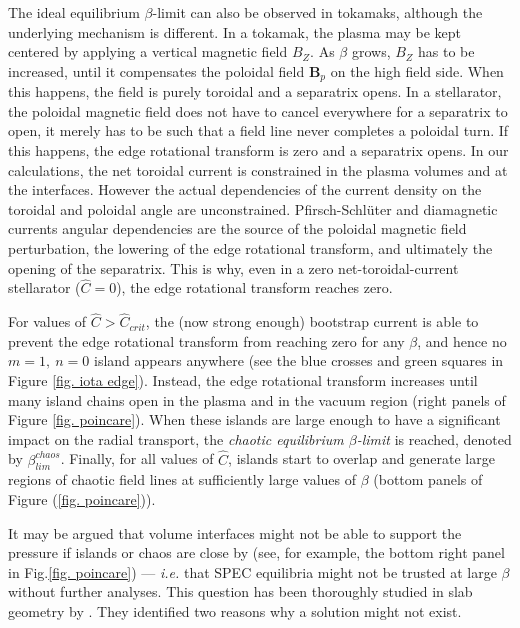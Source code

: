 \documentclass[my_thesis.tex]{subfiles}
\begin{document}
The ideal equilibrium $\beta$-limit can also be observed in tokamaks, although the underlying mechanism is different. In a tokamak, the plasma may be kept centered by applying a vertical magnetic field $B_Z$. As $\beta$ grows, $B_Z$ has to be increased, until it compensates the poloidal field $\mathbf{B}_p$ on the high field side. When this happens, the field is purely toroidal and a separatrix opens.
In a stellarator, the poloidal magnetic field does not have to cancel everywhere for a separatrix to open, it merely has to be such that a field line never completes a poloidal turn. If this happens, the edge rotational transform is zero and a separatrix opens.
In our calculations, the net toroidal current is constrained in the plasma volumes and at the interfaces. However the actual dependencies of the current density on the toroidal and poloidal angle are unconstrained. Pfirsch-Schl\"uter and diamagnetic currents angular dependencies are the source of the poloidal magnetic field perturbation, the lowering of the edge rotational transform, and ultimately the opening of the separatrix. This is why, even in a zero net-toroidal-current stellarator ($\hat{C}=0$), the edge rotational transform reaches zero.

For values of $\hat{C}>\hat{C}_{crit}$, the (now strong enough) bootstrap current is able to prevent the edge rotational transform from reaching zero for any $\beta$, and hence no $m=1,\ n=0$ island appears anywhere (see the blue crosses and green squares in Figure \ref{fig. iota edge}). 
Instead, the edge rotational transform increases until many island chains open in the plasma and in the vacuum region (right panels of Figure \ref{fig. poincare}). When these islands are large enough to have a significant impact on the radial transport, the \emph{chaotic equilibrium $\beta$-limit} is reached, denoted by $\beta_{lim}^{chaos}$. Finally, for all values of $\hat{C}$, islands start to overlap and generate large regions of chaotic field lines at sufficiently large values of $\beta$ (bottom panels of Figure (\ref{fig. poincare})).

It may be argued that volume interfaces might not be able to support the pressure if islands or chaos are close by (see, for example, the bottom right panel in Fig.\ref{fig. poincare}) --- \textit{i.e.} that SPEC equilibria might not be trusted at large $\beta$ without further analyses. This question has been thoroughly studied in slab geometry by \citet{Qu2021}. They identified two reasons why a solution might not exist.
\end{document}
